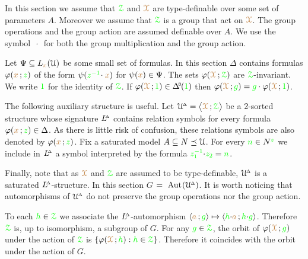 In this section we assume that $\grZ$ and $\mrX$ are type-definable over some set of parameters $A$.
Moreover we assume that $\grZ$ is a group that act on $\mrX$.
The group operations and the group action are assumed definable over $A$.
We use the symbol $\,\cdot\,$ for both the group multiplication and the group action.

Let $\Psi\subseteq L_{\mr x}(\U)$ be some small set of formulas.
In this section $\Delta$ contains formulas $\phi({\mr x}\,;{\gr z})$ of the form  $\psi({\gr z^{-1}}\!\cdot{\mr x})$ for $\psi({\mr x})\in\Psi$.
The sets $\phi(\mrX\,;\grZ)$ are $\grZ$-invariant.
We write ${\gr 1}$ for the identity of $\grZ$.
If $\phi(\mrX\,;{\gr 1})\in\BDelta({\gr 1})$ then $\phi(\mrX\,;{\gr g})={\gr g}\cdot\phi(\mrX\,;{\gr 1})$.

The following auxiliary structure is useful.
Let $\UDelta=\big\<\mrX\,;\grZ\big\>$ be a 2-sorted structure whose signature $\LDelta$ contains relation symbols for every formula $\phi({\mr x}\,;{\gr z})\in\Delta$.
As there is little risk of confusion, these relations symbols are also denoted by $\phi({\mr x}\,;{\gr z})$.
Fix a saturated model $A\subseteq N\preceq\U$.
For every ${\gr n}\in N^{\gr z}$ we include in $\LDelta$ a symbol interpreted by the formula ${\gr z_1^{-1}}{\cdot}{\gr z_2}={\gr n}$.

Finally, note that as $\mrX$ and $\grZ$ are assumed to be type-definable, $\UDelta$ is a saturated $\LDelta$-structure.
In this section \emph{$G$}$~=~\Aut(\UDelta)$.
It is worth noticing that automorphisms of $\UDelta$ do not preserve the group operations nor the group action.

To each ${\gr h}\in\grZ$ we associate the $\LDelta$-automorphism $\<{\mr a}\,;{\gr g}\>\mapsto\<{\gr h}{\cdot}{\mr a}\,;{\gr h}{\cdot}{\gr g}\>$.
Therefore $\grZ$ is, up to isomorphism, a subgroup of $G$.
For any ${\gr g}\in\grZ$, the orbit of $\phi(\mrX\,;{\gr g})$ under the action of $\grZ$ is $\{\phi(\mrX\,;{\gr h}) : {\gr h}\in\grZ\}$.
Therefore it coincides with the orbit under the action of $G$.


